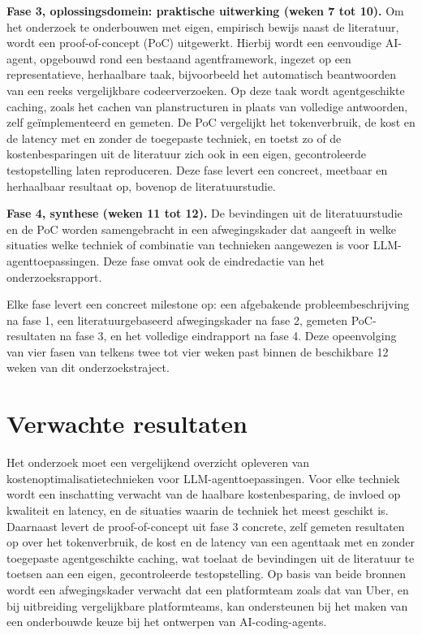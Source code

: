 \documentclass{hogent-article}
\begin{document}
\textbf{Fase 3, oplossingsdomein: praktische uitwerking (weken 7 tot 10).} Om het onderzoek te onderbouwen met eigen, empirisch bewijs naast de literatuur, wordt een proof-of-concept (PoC) uitgewerkt. Hierbij wordt een eenvoudige AI-agent, opgebouwd rond een bestaand agentframework, ingezet op een representatieve, herhaalbare taak, bijvoorbeeld het automatisch beantwoorden van een reeks vergelijkbare codeerverzoeken. Op deze taak wordt agentgeschikte caching, zoals het cachen van planstructuren in plaats van volledige antwoorden, zelf geïmplementeerd en gemeten. De PoC vergelijkt het tokenverbruik, de kost en de latency met en zonder de toegepaste techniek, en toetst zo of de kostenbesparingen uit de literatuur zich ook in een eigen, gecontroleerde testopstelling laten reproduceren. Deze fase levert een concreet, meetbaar en herhaalbaar resultaat op, bovenop de literatuurstudie.

\textbf{Fase 4, synthese (weken 11 tot 12).} De bevindingen uit de literatuurstudie en de PoC worden samengebracht in een afwegingskader dat aangeeft in welke situaties welke techniek of combinatie van technieken aangewezen is voor LLM-agenttoepassingen. Deze fase omvat ook de eindredactie van het onderzoeksrapport.

Elke fase levert een concreet milestone op: een afgebakende probleembeschrijving na fase 1, een literatuurgebaseerd afwegingskader na fase 2, gemeten PoC-resultaten na fase 3, en het volledige eindrapport na fase 4. Deze opeenvolging van vier fasen van telkens twee tot vier weken past binnen de beschikbare 12 weken van dit onderzoekstraject.

\section{Verwachte resultaten}%
\label{sec:resultaten}

Het onderzoek moet een vergelijkend overzicht opleveren van kostenoptimalisatietechnieken voor LLM-agenttoepassingen. Voor elke techniek wordt een inschatting verwacht van de haalbare kostenbesparing, de invloed op kwaliteit en latency, en de situaties waarin de techniek het meest geschikt is. Daarnaast levert de proof-of-concept uit fase 3 concrete, zelf gemeten resultaten op over het tokenverbruik, de kost en de latency van een agenttaak met en zonder toegepaste agentgeschikte caching, wat toelaat de bevindingen uit de literatuur te toetsen aan een eigen, gecontroleerde testopstelling. Op basis van beide bronnen wordt een afwegingskader verwacht dat een platformteam zoals dat van Uber, en bij uitbreiding vergelijkbare platformteams, kan ondersteunen bij het maken van een onderbouwde keuze bij het ontwerpen van AI-coding-agents.
\end{document}

